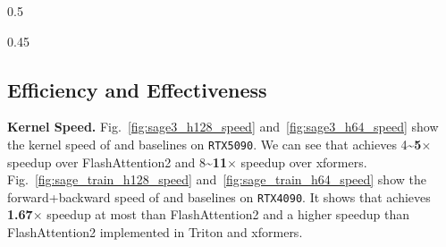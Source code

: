 \begin{table}[H]
\centering
\vspace{-.5em}
\caption{End-to-end speedup performance using \our and \sageback.}
\label{tab:e2e_latency}
\begin{subtable}[t]{0.5\textwidth}
    \centering
    \label{tab:e2e_inference_latency} %
\end{subtable}
\hfill
\begin{subtable}[t]{0.45\textwidth}
    \centering
    \label{tab:e2e_training_latency} %
\end{subtable}
\end{table}




\subsection{Efficiency and Effectiveness}
\noindent\textbf{Kernel Speed.} Fig.~\ref{fig:sage3_h128_speed} and~\ref{fig:sage3_h64_speed} show the kernel speed of \our and baselines on \texttt{RTX5090}. We can see that \our achieves 4\textasciitilde \textbf{5}$\times$ speedup over FlashAttention2 and 8\textasciitilde \textbf{11}$\times$ speedup over xformers. Fig.~\ref{fig:sage_train_h128_speed} and~\ref{fig:sage_train_h64_speed} show the forward+backward speed of \sageback and baselines on \texttt{RTX4090}. It shows that \sageback achieves \textbf{1.67}$\times$ speedup at most than FlashAttention2 and a higher speedup than FlashAttention2 implemented in Triton and xformers.

